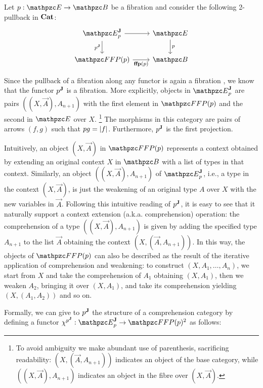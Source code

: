 \documentclass{lmcs} %
\theoremstyle{plain}\newtheorem{satz}[thm]{Satz} %
\begin{document}
Let $p : \ct{E}\to\ct{B}$ be  a fibration  and 
consider the following 2-pullback in $\mathbf{Cat}$: 
			\[\begin{tikzcd}
				{\JDomE{p}} & {\ct{E}} \\
				{\FFFP{p}} & {\ct{B}}
				\arrow[from=1-1, to=1-2]
				\arrow["{\JFib{p}}"', from=1-1, to=2-1]
				\arrow["p", from=1-2, to=2-2]
				\arrow["{{\fffp{p}}}"', from=2-1, to=2-2]
			\end{tikzcd}\]

Since the pullback of a fibration along any functor is again a fibration \cite{StreicherT:fibc}, 
we know that the functor ${p}^{\mathbf{J}}$ is a fibration. 
More explicitly, objects in $\JDomE{p}$ are pairs $((X,\vec{A}), A_{n+1})$ with the first element in $\FFFP{p}$ and the second in $\ct{E}$ over $X$.
\footnote{To avoid ambiguity we make abundant use of parenthesis, sacrificing readability: $(X,(\vec{A}, A_{n+1}))$ indicates an object of the base category, while $((X,\vec{A}),A_{n+1})$ indicates an object in the fibre over $(X,\vec{A})$.}
The morphisms in this category are pairs of arrows $(f,g)$ such that $pg=|f|$. Furthermore, ${p}^{\mathbf{J}}$ is the first projection.

Intuitively, an object $(X,\vec{A})$ in $\FFFP{p}$ represents a context obtained by extending an original context $X$ in $\ct{B}$ with a list of types in that context. 
Similarly, an object $((X,\vec{A}),A_{n+1})$ of $\JDomE{p}$, i.e., a type in the context $(X,\vec{A})$, is just the weakening  of an original type $A$ over $X$ with  the new variables in $\vec{A}$. 
% 
Following this intuitive reading of ${p}^{\mathbf{J}}$, 
it is easy to see that it naturally support a context extension (a.k.a. comprehension) operation: 
the comprehension of a type $((X,\vec{A}),A_{n+1})$ is given by adding the specified type $A_{n+1}$ to the list $\vec{A}$ obtaining the context $(X, (\vec{A},A_{n+1}))$.
In this way, the objects of $\FFFP{p}$ can also be described as the result of the iterative application of comprehension and weakening: 
to construct $(X, A_1,\ldots, A_n)$, we start from $X$ and take the comprehension of $A_1$ obtaining $(X,A_1)$, 
then we weaken $A_2$, bringing it over $(X,A_1)$, and take its comprehension yielding $(X, (A_1 , A_2))$ and so on.

Formally, we can give to ${p}^{\mathbf{J}}$ the structure of a comprehension category by defining 
a functor $\JFC{p}:\JDomE{p}\to\Arr{\FFFP{p}}$ as follows:
\end{document}
